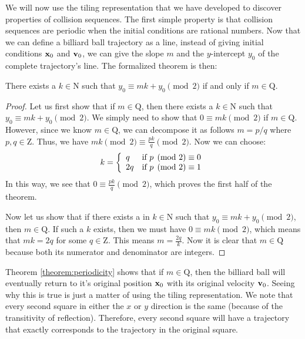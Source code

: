 We will now use the tiling representation that we have developed to discover properties of collision sequences. The first simple property is that collision sequences are periodic when the initial conditions are rational numbers. Now that we can define a billiard ball trajectory as a line, instead of giving initial conditions $\mathbf{x}_0$ and $\mathbf{v}_0$, we can give the slope $m$ and the $y$-intercept $y_0$ of the complete trajectory's line. The formalized theorem is then:

\begin{theorem}
  \label{theorem:periodicity}
  There exists a $k \in \mathrm{N}$ such that $y_0 \equiv mk + y_0 \pmod{2}$ if and only if $m \in \mathrm{Q}$.
\end{theorem}
\begin{proof}
  Let us first show that if $m \in \mathrm{Q}$, then there exists a $k \in \mathrm{N}$ such that $y_0 \equiv mk + y_0 \pmod{2}$. We simply need to show that $0 \equiv mk \pmod{2}$ if $m \in \mathrm{Q}$. However, since we know $m \in \mathrm{Q}$, we can decompose it as follows $m = p/q$ where $p,q \in \mathrm{Z}$. Thus, we have $mk \pmod{2} \equiv \frac{pk}{q} \pmod{2}$. Now we can choose:
  \begin{eqnarray}
    k = \left\{\begin{array}{l c}
      q & \textrm{if } p \pmod{2} \equiv 0 \\
      2q & \textrm{if } p \pmod{2} \equiv 1
    \end{array}\right.
  \end{eqnarray}
  In this way, we see that $0 \equiv \frac{pk}{q} \pmod{2}$, which proves the first half of the theorem.

  Now let us show that if there exists a in $k \in \mathrm{N}$ such that $y_0 \equiv mk + y_0 \pmod{2}$, then $m \in \mathrm{Q}$. If such a $k$ exists, then we must have $0 \equiv mk \pmod{2}$, which means that $mk = 2q$ for some $q \in \mathrm{Z}$. This means $m = \frac{2q}{k}$. Now it is clear that $m \in \mathrm{Q}$ because both its numerator and denominator are integers.
\end{proof}

Theorem \ref{theorem:periodicity} shows that if $m \in \mathrm{Q}$, then the billiard ball will eventually return to it's original position $\mathbf{x}_0$ with its original velocity $\mathbf{v}_0$. Seeing why this is true is just a matter of using the tiling representation. We note that every second square in either the $x$ or $y$ direction is the same (because of the transitivity of reflection). Therefore, every second square will have a trajectory that exactly corresponds to the trajectory in the original square.

